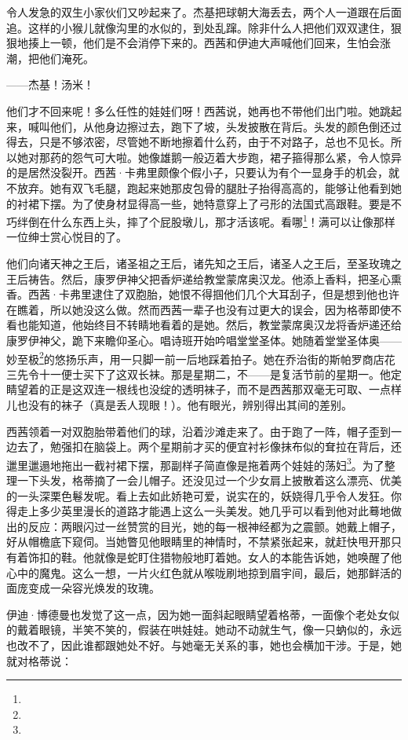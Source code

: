 \par 令人发急的双生小家伙们又吵起来了。杰基把球朝大海丢去，两个人一道跟在后面追。这样的小猴儿就像沟里的水似的，到处乱蹿。除非什么人把他们双双逮住，狠狠地揍上一顿，他们是不会消停下来的。西茜和伊迪大声喊他们回来，生怕会涨潮，把他们淹死。
\par ——杰基！汤米！
\par 他们才不回来呢！多么任性的娃娃们呀！西茜说，她再也不带他们出门啦。她跳起来，喊叫他们，从他身边擦过去，跑下了坡，头发披散在背后。头发的颜色倒还过得去，只是不够浓密，尽管她不断地擦着什么药，由于不对路子，总也不见长。所以她对那药的怨气可大啦。她像雄鹅一般迈着大步跑，裙子箍得那么紧，令人惊异的是居然没裂开。西茜·卡弗里颇像个假小子，只要认为有个一显身手的机会，就不放弃。她有双飞毛腿，跑起来她那皮包骨的腿肚子抬得高高的，能够让他看到她的衬裙下摆。为了使身材显得高一些，她特意穿上了弓形的法国式高跟鞋。要是不巧绊倒在什么东西上头，摔了个屁股墩儿，那才活该呢。看哪\footnote{}！满可以让像那样一位绅士赏心悦目的了。
\par 他们向诸天神之王后，诸圣祖之王后，诸先知之王后，诸圣人之王后，至圣玫瑰之王后祷告。然后，康罗伊神父把香炉递给教堂蒙席奥汉龙。他添上香料，把圣心熏香。西茜·卡弗里逮住了双胞胎，她恨不得掴他们几个大耳刮子，但是想到他也许在瞧着，所以她没这么做。然而西茜一辈子也没有过更大的误会，因为格蒂即使不看也能知道，他始终目不转睛地看着的是她。然后，教堂蒙席奥汉龙将香炉递还给康罗伊神父，跪下来瞻仰圣心。唱诗班开始吟唱堂堂圣体。她随着堂堂圣体奥——妙至极\footnote{}的悠扬乐声，用一只脚一前一后地踩着拍子。她在乔治街的斯帕罗商店花三先令十一便士买下了这双长袜。那是星期二，不——是复活节前的星期一。他定睛望着的正是这双连一根线也没绽的透明袜子，而不是西茜那双毫无可取、一点样儿也没有的袜子（真是丢人现眼！）。他有眼光，辨别得出其间的差别。
\par 西茜领着一对双胞胎带着他们的球，沿着沙滩走来了。由于跑了一阵，帽子歪到一边去了，勉强扣在脑袋上。两个星期前才买的便宜衬衫像抹布似的耷拉在背后，还邋里邋遢地拖出一截衬裙下摆，那副样子简直像是拖着两个娃娃的荡妇\footnote{}。为了整理一下头发，格蒂摘了一会儿帽子。还没见过一个少女肩上披散着这么漂亮、优美的一头深栗色鬈发呢。看上去如此娇艳可爱，说实在的，妖娆得几乎令人发狂。你得走上多少英里漫长的道路才能遇上这么一头美发。她几乎可以看到他对此蓦地做出的反应：两眼闪过一丝赞赏的目光，她的每一根神经都为之震颤。她戴上帽子，好从帽檐底下窥伺。当她瞥见他眼睛里的神情时，不禁紧张起来，就赶快甩开那只有着饰扣的鞋。他就像是蛇盯住猎物般地盯着她。女人的本能告诉她，她唤醒了他心中的魔鬼。这么一想，一片火红色就从喉咙刷地掠到眉宇间，最后，她那鲜活的面庞变成一朵容光焕发的玫瑰。
\par 伊迪·博德曼也发觉了这一点，因为她一面斜起眼睛望着格蒂，一面像个老处女似的戴着眼镜，半笑不笑的，假装在哄娃娃。她动不动就生气，像一只蚋似的，永远也改不了，因此谁都跟她处不好。与她毫无关系的事，她也会横加干涉。于是，她就对格蒂说：
